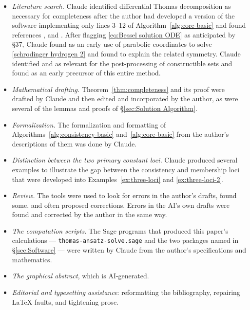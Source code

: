\documentclass{article}
\theoremstyle{definition}
\theoremstyle{plain}
\begin{document}
\begin{itemize}

\item {\it Literature search.}  Claude identified differential Thomas
decomposition as necessary for completeness after the author had developed
a version of the software implementing only lines 3--12 of Algorithm~\ref{alg:core-basic}
and found references \cite{ThomasDecomp}, \cite{LHRcontrol} and \cite{RobertzLNM}.
After flagging \eqref{eq:Bessel solution ODE} as anticipated by \cite{LandauLifshitz} \S 37,
Claude found \cite{Schrodinger26} as an early use of parabolic coordinates
to solve \eqref{schrodinger hydrogen 2}
and found \cite{BanderItzykson} to explain the related symmetry.
Claude identified \cite{BrunatMontes} and \cite{CSTools} as relevant for
the post-processing of constructible sets
and found \cite{Chaharbashloo2013} as an early precursor of this entire method.

\item {\it Mathematical drafting.}  Theorem~\ref{thm:completeness} and its
proof were drafted by Claude and then edited and incorporated by the author, as
were several of the lemmas and proofs of
\S\ref{sec:Solution Algorithm}.

\item {\it Formalization.}  The
formalization and formatting of Algorithms~\ref{alg:consistency-basic}
and~\ref{alg:core-basic} from the author's descriptions of them
was done by Claude.

\item {\it Distinction between the two primary constant loci.}
Claude produced several examples to illustrate the gap between
the consistency and membership loci that were developed into
Examples~\ref{ex:three-loci} and \ref{ex:three-loci-2}.

\item {\it Review.}  The tools were used to look for errors in the author's
drafts, found some, and often proposed corrections.  Errors in
the AI's own drafts were found and corrected by the author in the same way.

\item {\it The computation scripts.}  The Sage programs that produced this
paper's calculations --- {\tt thomas-ansatz-solve.sage} and the two packages
named in \S\ref{sec:Software} --- were written by Claude from the author's
specifications and mathematics.

\item {\it The graphical abstract}, which is AI-generated.

\item {\it Editorial and typesetting assistance}: reformatting the
bibliography, repairing \LaTeX{} faults, and tightening prose.

\end{itemize}
\end{document}
